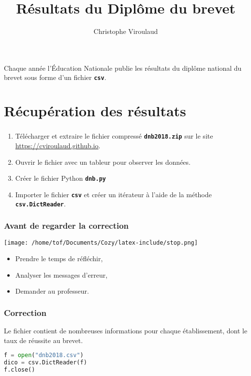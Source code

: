 \documentclass[svgnames,11pt]{beamer}
\author[]{Christophe Viroulaud}
\title{Résultats du Diplôme du brevet}
\date{\framebox{\textbf{Algo 11}}}
\institute{Terminale - NSI}
\begin{document}
\begin{frame}
\titlepage
\end{frame}
\begin{frame}
    \frametitle{}

    Chaque année l'Éducation Nationale publie les résultats du diplôme national du brevet sous forme d'un fichier \textbf{\texttt{csv}}.

\end{frame}
\section{Récupération des résultats}
\begin{frame}
    \frametitle{}

\begin{activite}
\begin{enumerate}
    \item Télécharger et extraire le fichier compressé \texttt{\textbf{dnb2018.zip}} sur le site \url{https://cviroulaud.github.io}.
    \item Ouvrir le fichier avec un tableur pour observer les données.
    \item Créer le fichier Python \textbf{\texttt{dnb.py}}
    \item Importer le fichier \textbf{\texttt{csv}} et créer un itérateur à l'aide de la méthode \textbf{\texttt{csv.DictReader}}.
\end{enumerate}
\end{activite}

\end{frame}
\begin{frame}
    \frametitle{Avant de regarder la correction}
\begin{center}
    \centering
    \texttt{[image: /home/tof/Documents/Cozy/latex-include/stop.png]}
    \end{center}
{\Large
    \begin{itemize}
        \item Prendre le temps de réfléchir,
        \item Analyser les messages d'erreur,
        \item Demander au professeur.
    \end{itemize}
}
\end{frame}
\begin{frame}[fragile]
    \frametitle{Correction}
Le fichier contient de nombreuses informations pour chaque établissement, dont le taux de réussite au brevet.
\begin{center}
\begin{lstlisting}[language=Python , basicstyle=\ttfamily\small, xleftmargin=2em, xrightmargin=2em]
f = open("dnb2018.csv")
dico = csv.DictReader(f)
f.close()
\end{lstlisting}
\end{center}   

\end{frame}
\end{document}
